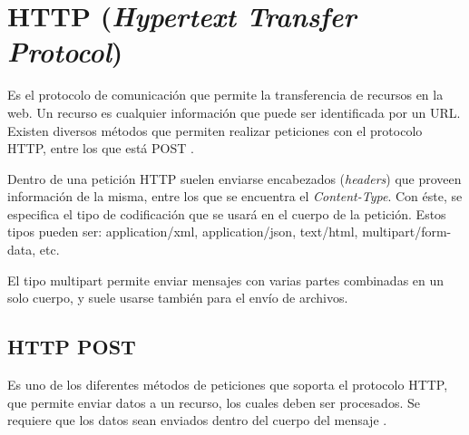 \section{HTTP (\textit{Hypertext Transfer Protocol})}\label{HTTP}

Es el protocolo de comunicación que permite la transferencia de recursos en la web. Un recurso es cualquier información que puede ser identificada por un URL. Existen diversos métodos que permiten realizar peticiones con el protocolo HTTP, entre los que está POST \cite{HTTP2}. 

Dentro de una petición HTTP suelen enviarse encabezados (\textit{headers}) que proveen información de la misma, entre los que se encuentra el \textit{Content-Type}. Con éste, se especifica el tipo de codificación que se usará en el cuerpo de la petición. Estos tipos pueden ser: application/xml, application/json, text/html, multipart/form-data, etc. 

El tipo multipart permite enviar mensajes con varias partes combinadas en un solo cuerpo, y suele usarse también para el envío de archivos. \cite{HTTP1}

\subsection{HTTP POST}

Es uno de los diferentes métodos de peticiones que soporta el protocolo HTTP, que permite enviar datos a un recurso, los cuales deben ser procesados. Se requiere que los datos sean enviados dentro del cuerpo del mensaje \cite{HTTP3}.

